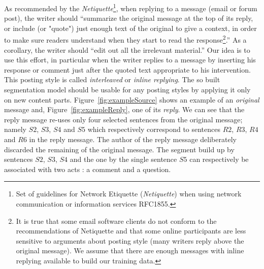 % 
As recommended by the \textit{Netiquette}\footnote{Set of guidelines for Network Etiquette (\textit{Netiquette}) when using network communication or information services RFC1855. %
}, when replying to a message (email or forum post), the writer should 
 ``summarize the original message at the top of its reply, %
or include (or "quote") just enough text of the original to give a context, in order to make sure readers understand when they start to read the response\footnote{It is true that some email software clients do not conform to the recommendations of Netiquette and that some online participants are less sensitive to arguments about posting style (many writers reply above  the original message).
We assume that there are enough messages with inline replying available to build our training data.}.''  As a corollary, the writer should ``edit out all the irrelevant material.''
%
Our idea is to use this effort, in particular when the writer replies to a message by inserting his response or comment just after the quoted text appropriate to his intervention. 
%
This posting style is called \textit{interleaved} or \textit{inline replying}.
%
%
The so built segmentation model should be usable for any posting styles by applying it only on new content parts.
%
%
Figure~\ref{fig:exampleSource} shows an example of an \textit{original} %
message and, Figure~\ref{fig:exampleReply}, one of its \textit{reply}.
We can see that the reply message re-uses only four selected sentences from the original message; namely $S2$, $S3$, $S4$ and $S5$ which respectively correspond to sentences  $R2$, $R3$, $R4$ and $R6$ in the reply message.
The author of the reply message deliberately discarded the remaining of the original message.
%
The segment build up by sentences $S2$, $S3$, $S4$ and the one by the single sentence $S5$ can respectively be associated with two acts : a comment and a question.

